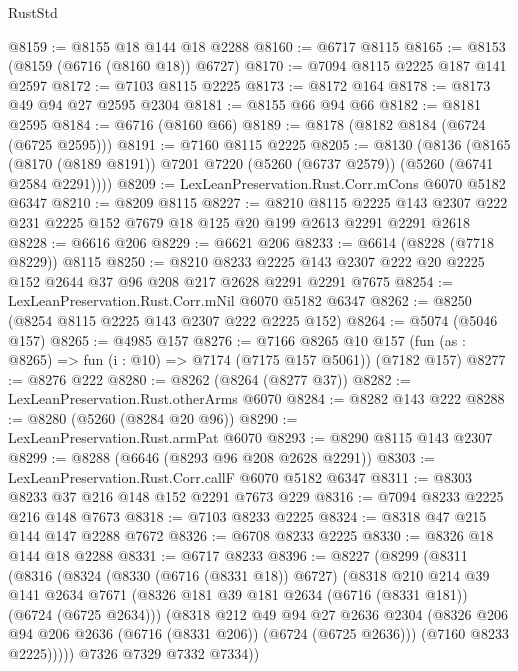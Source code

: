 \begin{lexlean}{RustStd}
\begin{coremodule}
@8159 := @8155 @18 @144 @18 @2288
@8160 := @6717 @8115
@8165 := @8153 (@8159 (@6716 (@8160 @18)) @6727)
@8170 := @7094 @8115 @2225 @187 @141 @2597
@8172 := @7103 @8115 @2225
@8173 := @8172 @164
@8178 := @8173 @49 @94 @27 @2595 @2304
@8181 := @8155 @66 @94 @66
@8182 := @8181 @2595
@8184 := @6716 (@8160 @66)
@8189 := @8178 (@8182 @8184 (@6724 (@6725 @2595)))
@8191 := @7160 @8115 @2225
@8205 := @8130
    (@8136
      (@8165 (@8170 (@8189 @8191)) @7201 @7220 (@5260 (@6737 @2579)) (@5260 (@6741 @2584 @2291))))
@8209 := LexLeanPreservation.Rust.Corr.mCons @6070 @5182 @6347
@8210 := @8209 @8115
@8227 := @8210
    @8115
    @2225
    @143
    @2307
    @222
    @231
    @2225
    @152
    @7679
    @18
    @125
    @20
    @199
    @2613
    @2291
    @2291
    @2618
@8228 := @6616 @206
@8229 := @6621 @206
@8233 := @6614 (@8228 (@7718 @8229)) @8115
@8250 := @8210
    @8233
    @2225
    @143
    @2307
    @222
    @20
    @2225
    @152
    @2644
    @37
    @96
    @208
    @217
    @2628
    @2291
    @2291
    @7675
@8254 := LexLeanPreservation.Rust.Corr.mNil @6070 @5182 @6347
@8262 := @8250 (@8254 @8115 @2225 @143 @2307 @222 @2225 @152)
@8264 := @5074 (@5046 @157)
@8265 := @4985 @157
@8276 := @7166
    @8265
    @10
    @157
    (fun (as : @8265) => fun (i : @10) => @7174 (@7175 @157 @5061))
    (@7182 @157)
@8277 := @8276 @222
@8280 := @8262 (@8264 (@8277 @37))
@8282 := LexLeanPreservation.Rust.otherArms @6070
@8284 := @8282 @143 @222
@8288 := @8280 (@5260 (@8284 @20 @96))
@8290 := LexLeanPreservation.Rust.armPat @6070
@8293 := @8290 @8115 @143 @2307
@8299 := @8288 (@6646 (@8293 @96 @208 @2628 @2291))
@8303 := LexLeanPreservation.Rust.Corr.callF @6070 @5182 @6347
@8311 := @8303 @8233 @37 @216 @148 @152 @2291 @7673 @229
@8316 := @7094 @8233 @2225 @216 @148 @7673
@8318 := @7103 @8233 @2225
@8324 := @8318 @47 @215 @144 @147 @2288 @7672
@8326 := @6708 @8233 @2225
@8330 := @8326 @18 @144 @18 @2288
@8331 := @6717 @8233
@8396 := @8227
    (@8299
      (@8311
        (@8316
          (@8324
            (@8330 (@6716 (@8331 @18)) @6727)
            (@8318
              @210
              @214
              @39
              @141
              @2634
              @7671
              (@8326 @181 @39 @181 @2634 (@6716 (@8331 @181)) (@6724 (@6725 @2634)))
              (@8318
                @212
                @49
                @94
                @27
                @2636
                @2304
                (@8326 @206 @94 @206 @2636 (@6716 (@8331 @206)) (@6724 (@6725 @2636)))
                (@7160 @8233 @2225)))))
        @7326
        @7329
        @7332
        @7334))

\end{coremodule}
\end{lexlean}
